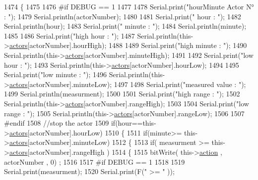 \begin{DoxyCode}
1474 \{
1475 
1476 \textcolor{preprocessor}{#if DEBUG == 1}
1477     
1478     Serial.print(\textcolor{stringliteral}{"hourMinute Actor N° : "});
1479     Serial.println(actorNumber);
1480 
1481     Serial.print(\textcolor{stringliteral}{" hour : "});
1482     Serial.println(hour);
1483     Serial.print(\textcolor{stringliteral}{" minute : "});
1484     Serial.println(minute);
1485 
1486     Serial.print(\textcolor{stringliteral}{"high hour : "});
1487     Serial.println(this->\hyperlink{class_jetpack_a7e16d2f97837f9712a2e6de1c50d99db}{actors}[actorNumber].hourHigh);
1488 
1489     Serial.print(\textcolor{stringliteral}{"high minute : "});
1490     Serial.println(this->\hyperlink{class_jetpack_a7e16d2f97837f9712a2e6de1c50d99db}{actors}[actorNumber].minuteHigh);
1491 
1492     Serial.print(\textcolor{stringliteral}{"low hour : "});
1493     Serial.println(this->\hyperlink{class_jetpack_a7e16d2f97837f9712a2e6de1c50d99db}{actors}[actorNumber].hourLow);
1494 
1495     Serial.print(\textcolor{stringliteral}{"low minute : "});
1496     Serial.println(this->\hyperlink{class_jetpack_a7e16d2f97837f9712a2e6de1c50d99db}{actors}[actorNumber].minuteLow);
1497 
1498     Serial.print(\textcolor{stringliteral}{"measured value : "});
1499     Serial.println(measurment);
1500 
1501     Serial.print(\textcolor{stringliteral}{"high range : "});
1502     Serial.println(this->\hyperlink{class_jetpack_a7e16d2f97837f9712a2e6de1c50d99db}{actors}[actorNumber].rangeHigh);
1503 
1504     Serial.print(\textcolor{stringliteral}{"low range : "});
1505     Serial.println(this->\hyperlink{class_jetpack_a7e16d2f97837f9712a2e6de1c50d99db}{actors}[actorNumber].rangeLow);
1506 
1507 \textcolor{preprocessor}{#endif}
1508     \textcolor{comment}{//stop the actor}
1509     \textcolor{keywordflow}{if}(hour==this->\hyperlink{class_jetpack_a7e16d2f97837f9712a2e6de1c50d99db}{actors}[actorNumber].hourLow)
1510     \{
1511         \textcolor{keywordflow}{if}(minute>= this->\hyperlink{class_jetpack_a7e16d2f97837f9712a2e6de1c50d99db}{actors}[actorNumber].minuteLow)
1512         \{
1513             \textcolor{keywordflow}{if}( measurment >= this->\hyperlink{class_jetpack_a7e16d2f97837f9712a2e6de1c50d99db}{actors}[actorNumber].rangeHigh )
1514             \{
1515                 bitWrite( this->\hyperlink{class_jetpack_aca3142925a7b0834b34ae91d26af7765}{action} , actorNumber , 0) ;
1516 
1517 \textcolor{preprocessor}{            #if DEBUG == 1 }
1518 
1519                 Serial.print(measurment);
1520                 Serial.print(F(\textcolor{stringliteral}{" >= "} ));

\end{DoxyCode}
